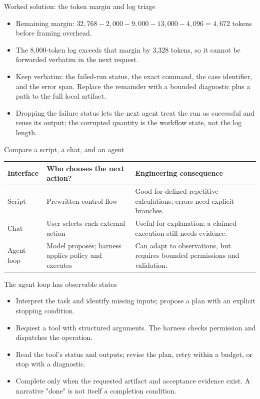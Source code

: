 \documentclass[aspectratio=169,11pt]{beamer}
\begin{document}
\begin{frame}[t,fragile]{Worked solution: the token margin and log triage}
\fontsize{11.5}{14}\selectfont
\begin{itemize}\setlength{\itemsep}{2mm}
\item Remaining margin: $32{,}768 - 2{,}000 - 9{,}000 - 13{,}000 - 4{,}096 = 4{,}672$ tokens before framing overhead.
\item The 8,000-token log exceeds that margin by 3,328 tokens, so it cannot be forwarded verbatim in the next request.
\item Keep verbatim: the failed-run status, the exact command, the case identifier, and the error span. Replace the remainder with a bounded diagnostic plus a path to the full local artifact.
\item Dropping the failure status lets the next agent treat the run as successful and reuse its output; the corrupted quantity is the workflow state, not the log length.
\end{itemize}
\end{frame}
\begin{frame}[t,fragile]{Compare a script, a chat, and an agent}
\fontsize{10.5}{12.5}\selectfont\setlength{\tabcolsep}{4pt}\renewcommand{\arraystretch}{1.15}
\begin{tabular}{>{\raggedright\arraybackslash}p{}>{\raggedright\arraybackslash}p{}>{\raggedright\arraybackslash}p{}}
\toprule
\textbf{Interface} & \textbf{Who chooses the next action?} & \textbf{Engineering consequence} \\ \midrule
Script & Prewritten control flow & Good for defined repetitive calculations; errors need explicit branches. \\[2pt]
Chat & User selects each external action & Useful for explanation; a claimed execution still needs evidence. \\[2pt]
Agent loop & Model proposes; harness applies policy and executes & Can adapt to observations, but requires bounded permissions and validation. \\[2pt]
\bottomrule\end{tabular}\par\vspace{2mm}
\end{frame}
\begin{frame}[t,fragile]{The agent loop has observable states}
\fontsize{11.5}{14}\selectfont
\begin{itemize}\setlength{\itemsep}{2mm}
\item Interpret the task and identify missing inputs; propose a plan with an explicit stopping condition.
\item Request a tool with structured arguments. The harness checks permission and dispatches the operation.
\item Read the tool's status and outputs; revise the plan, retry within a budget, or stop with a diagnostic.
\item Complete only when the requested artifact and acceptance evidence exist. A narrative "done" is not itself a completion condition.
\end{itemize}
\end{frame}
\end{document}
